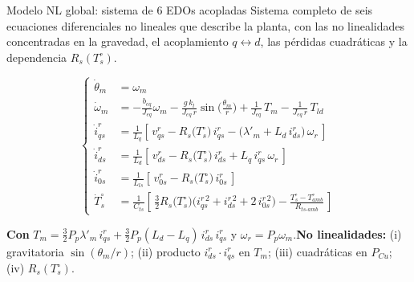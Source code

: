 \documentclass[aspectratio=169,t]{beamer}
\begin{document}
\begin{frame}{Modelo NL global: sistema de 6 EDOs acopladas}
{\small\color{uncGray}Sistema completo de seis ecuaciones diferenciales no lineales que describe la planta, con las no linealidades concentradas en la gravedad, el acoplamiento $q\!\leftrightarrow\!d$, las pérdidas cuadráticas y la dependencia $R_s(T_s^\circ)$.}\par
\vspace{2mm}

\footnotesize
\begin{equation*}
\left\{
\begin{aligned}
\dot{\theta}_m &= \omega_m \\[1pt]
\dot{\omega}_m &= -\tfrac{b_{eq}}{J_{eq}}\omega_m - \tfrac{g\,k_l}{J_{eq}\,r}\sin\!\big(\tfrac{\theta_m}{r}\big) + \tfrac{1}{J_{eq}}\,T_m - \tfrac{1}{J_{eq}\,r}\,T_{ld} \\[1pt]
\dot{i}_{qs}^{r} &= \tfrac{1}{L_q}\!\left[\,v_{qs}^{r} - R_s\!\big(T_s^\circ\big)\, i_{qs}^{r} - \big(\lambda'_m + L_d\,i_{ds}^{r}\big)\,\omega_r\,\right] \\[1pt]
\dot{i}_{ds}^{r} &= \tfrac{1}{L_d}\!\left[\,v_{ds}^{r} - R_s\!\big(T_s^\circ\big)\, i_{ds}^{r} + L_q\,i_{qs}^{r}\,\omega_r\,\right] \\[1pt]
\dot{i}_{0s}^{r} &= \tfrac{1}{L_{ls}}\!\left[\,v_{0s}^{r} - R_s\!\big(T_s^\circ\big)\, i_{0s}^{r}\,\right] \\[1pt]
\dot{T}_s^\circ &= \tfrac{1}{C_{ts}}\!\left[\,\tfrac{3}{2}R_s\!\big(T_s^\circ\big)\big(i_{qs}^{r\,2}+i_{ds}^{r\,2}+2\,i_{0s}^{r\,2}\big) - \tfrac{T_s^\circ - T_{amb}^\circ}{R_{ts\text{-}amb}}\,\right]
\end{aligned}\right.
\end{equation*}
\normalsize

\vspace{1mm}
{\small \textbf{Con} $T_m = \tfrac{3}{2}P_p\lambda'_m\,i_{qs}^{r} + \tfrac{3}{2}P_p(L_d-L_q)\,i_{ds}^{r}\,i_{qs}^{r}$ \;y\; $\omega_r = P_p\omega_m$.\quad \textbf{No linealidades:} (i) gravitatoria $\sin(\theta_m/r)$; (ii) producto $i_{ds}^{r}\!\cdot\! i_{qs}^{r}$ en $T_m$; (iii) cuadráticas en $P_{Cu}$; (iv) $R_s(T_s^\circ)$.}
\end{frame}
\end{document}
